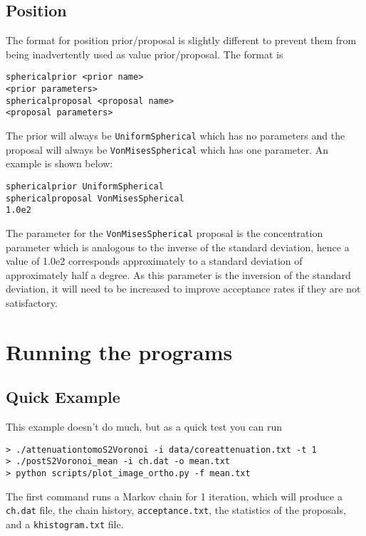 \documentclass{article}
\begin{document}
\subsection{Position}

The format for position prior/proposal is slightly different to prevent
them from being inadvertently used as value prior/proposal. The format
is 

\begin{verbatim}
sphericalprior <prior name>
<prior parameters>
sphericalproposal <proposal name>
<proposal parameters>
\end{verbatim}

The prior will always be {\tt UniformSpherical} which has no parameters
and the proposal will always be {\tt VonMisesSpherical} which has one
parameter. An example is shown below:

\begin{verbatim}
sphericalprior UniformSpherical
sphericalproposal VonMisesSpherical
1.0e2
\end{verbatim}

The parameter for the {\tt VonMisesSpherical} proposal is the
concentration parameter which is analogous to the inverse of the
standard deviation, hence a value of 1.0e2 corresponds approximately
to a standard deviation of approximately half a degree. As this
parameter is the inversion of the standard deviation, it will need
to be increased to improve acceptance rates if they are not satisfactory.

\section{Running the programs}

\subsection{Quick Example}

This example doesn't do much, but as a quick test you can run

\begin{verbatim}
> ./attenuationtomoS2Voronoi -i data/coreattenuation.txt -t 1
> ./postS2Voronoi_mean -i ch.dat -o mean.txt
> python scripts/plot_image_ortho.py -f mean.txt
\end{verbatim}

The first command runs a Markov chain for 1 iteration, which will produce a
{\tt ch.dat} file, the chain history, {\tt acceptance.txt}, the statistics
of the proposals, and a {\tt khistogram.txt} file.
\end{document}
